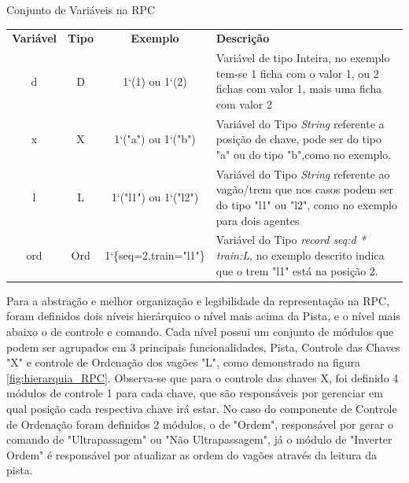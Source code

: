 \begin{quadro}[ht]
\caption{Conjunto de Variáveis na RPC}
\begin{tabularx}{\textwidth}{|c|c|c|X|}
\cline{1-4}
\textbf{Variável} & \textbf{Tipo} & \textbf{Exemplo} & \textbf{Descrição} \\ 
\cline{1-4} %
d & D & 1`(1) ou 1`(2) & Variável de tipo Inteira, no exemplo tem-se 1 ficha com o valor 1, ou 2 fichas com valor 1, mais uma ficha com valor 2 \\ \cline{1-4} %
x & X & 1`("a") ou 1`("b") & Variável do Tipo \textit{String} referente a posição de chave, pode ser do tipo "a" ou do tipo "b",como no exemplo. \\ \cline{1-4} %
l & L & 1`("l1") ou 1`("l2") & Variável do Tipo \textit{String} referente ao vagão/trem que nos casos podem ser do tipo "l1" ou "l2", como no exemplo para dois agentes \\ \cline{1-4} %
ord & Ord & 1`\{seq=2,train="l1"\} & Variável do Tipo \textit{record seq:d * train:L}, no exemplo descrito indica que o trem "l1" está na posição 2. \\ \cline{1-4} 
\end{tabularx}
\label{qua:variaveis_RPC}
\end{quadro}

Para a abstração e melhor organização e legibilidade da representação na RPC, foram definidos dois níveis hierárquico o nível mais acima da Pista, e o nível mais abaixo o de controle e comando. Cada nível possui um conjunto de módulos que podem ser agrupados em 3 principais funcionalidades, Pista, Controle das Chaves "X" e controle de Ordenação dos vagões "L", como demonstrado na figura \ref{fig:hierarquia_RPC}. Observa-se que para o controle das chaves X, foi definido 4 módulos de controle 1 para cada chave, que são responsáveis por gerenciar em qual posição cada respectiva chave irá estar. No caso do componente de Controle de Ordenação foram definidos 2 módulos, o de "Ordem", responsável por gerar o comando de "Ultrapassagem" ou "Não Ultrapassagem", já o módulo de "Inverter Ordem" é responsável por atualizar as ordem do vagões através da leitura da pista.

